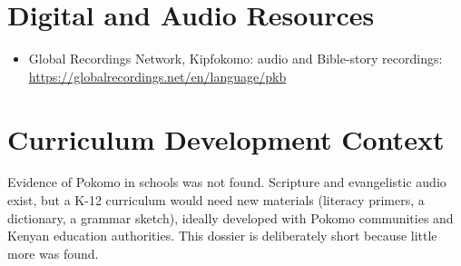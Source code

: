\documentclass[12pt]{article}
\begin{document}
\section{Digital and Audio Resources}
\begin{itemize}
\item Global Recordings Network, Kipfokomo: audio and Bible-story recordings: \url{https://globalrecordings.net/en/language/pkb}
\end{itemize}

\section{Curriculum Development Context}
Evidence of Pokomo in schools was not found. Scripture and evangelistic audio exist, but a K-12 curriculum would need new materials (literacy primers, a dictionary, a grammar sketch), ideally developed with Pokomo communities and Kenyan education authorities. This dossier is deliberately short because little more was found.
\end{document}
